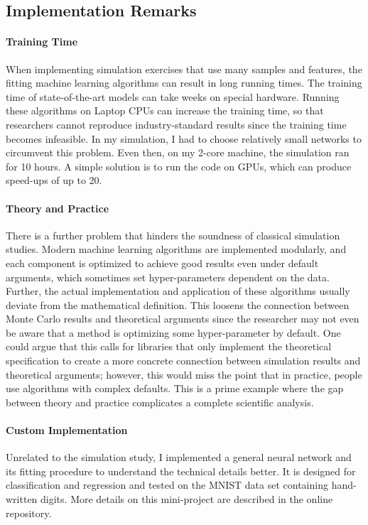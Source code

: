 \subsection*{Implementation Remarks}

\paragraph{Training Time}

When implementing simulation exercises that use many samples and features, the fitting
machine learning algorithms can result in long running times. The training time of
state-of-the-art models can take weeks on special hardware. Running these algorithms on
Laptop CPUs can increase the training time, so that researchers cannot reproduce
industry-standard results since the training time becomes infeasible. In my simulation,
I had to choose relatively small networks to circumvent this problem. Even then, on my
2-core machine, the simulation ran for 10 hours. A simple solution is to run the code on
GPUs, which can produce speed-ups of up to 20.

\paragraph{Theory and Practice}

There is a further problem that hinders the soundness of classical simulation studies.
Modern machine learning algorithms are implemented modularly, and each component is
optimized to achieve good results even under default arguments, which sometimes set
hyper-parameters dependent on the data. Further, the actual implementation and
application of these algorithms usually deviate from the mathematical definition. This
loosens the connection between Monte Carlo results and theoretical arguments since the
researcher may not even be aware that a method is optimizing some hyper-parameter by
default. One could argue that this calls for libraries that only implement the
theoretical specification to create a more concrete connection between simulation
results and theoretical arguments; however, this would miss the point that in practice,
people use algorithms with complex defaults. This is a prime example where the gap
between theory and practice complicates a complete scientific analysis.

\paragraph{Custom Implementation}

Unrelated to the simulation study, I implemented a general neural network and its
fitting procedure to understand the technical details better. It is designed for
classification and regression and tested on the MNIST data set containing hand-written
digits. More details on this mini-project are described in the online repository.
